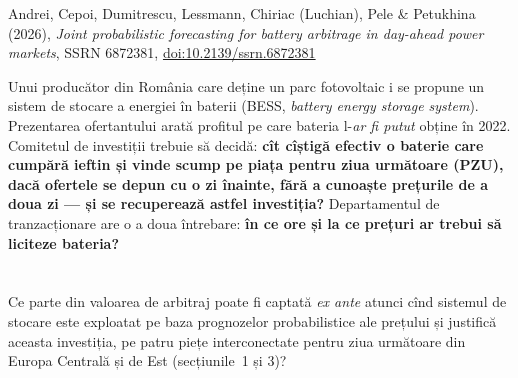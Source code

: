 
\renewcommand{\emqacase}{\T{Research case 6 (Lecture 6)}{Studiul de caz 6 (cursul 6)}}

%
          { Andrei, Cepoi, Dumitrescu, Lessmann, Chiriac (Luchian), Pele \& Petukhina (2026), \emph{Joint probabilistic forecasting for battery arbitrage in day-ahead power markets},
           SSRN 6872381, \href{https://doi.org/10.2139/ssrn.6872381}{doi:10.2139/ssrn.6872381}}

\begin{scenario}
%
{Unui producător din România care deține un parc fotovoltaic i se propune un sistem de stocare a energiei în baterii (BESS, \emph{battery energy storage system}). Prezentarea ofertantului arată profitul pe care bateria l-\emph{ar fi putut} obține în 2022.
Comitetul de investiții trebuie să decidă: \textbf{cît cîștigă efectiv o baterie care cumpără ieftin și vinde scump pe piața pentru ziua următoare (PZU), dacă ofertele se depun cu o zi înainte, fără a cunoaște prețurile de a doua zi --- și se recuperează astfel investiția?}
Departamentul de tranzacționare are o a doua întrebare: \textbf{în ce ore și la ce prețuri ar trebui să liciteze bateria?}}
\end{scenario}

\section{}
\textbf{} %
{Ce parte din valoarea de arbitraj poate fi captată \emph{ex ante} atunci cînd sistemul de stocare este exploatat pe baza prognozelor probabilistice ale prețului și justifică aceasta investiția, pe patru piețe interconectate pentru ziua următoare din Europa Centrală și de Est (secțiunile~1 și 3)?}

